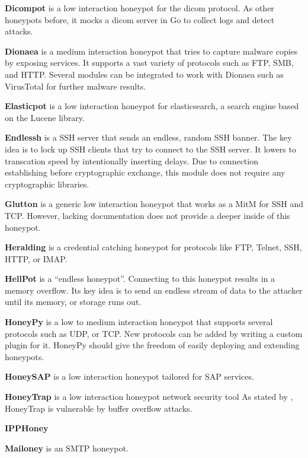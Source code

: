 \textbf{Dicompot} \cite{dicompot2021} is a low interaction honeypot for the \ac{dicom} protocol.
As other honeypots before, it mocks a \ac{dicom} server in Go to collect logs and detect attacks.

\textbf{Dionaea} \cite{dionaea2021} is a medium interaction honeypot that tries to capture malware copies by exposing services.
It supports a vast variety of protocols such as FTP, SMB, and HTTP.
Several modules can be integrated to work with Dionaea such as VirusTotal for further malware results.

\textbf{Elasticpot} \cite{elasticpot2021} is a low interaction honeypot for elasticsearch, a search engine based on the Lucene library.

\textbf{Endlessh} \cite{endlessh2021} is a SSH server that sends an endless, random SSH banner.
The key idea is to lock up SSH clients that try to connect to the SSH server.
It lowers to transcation speed by intentionally inserting delays.
Due to connection establishing before cryptographic exchange, this module does not require any cryptographic libraries.

\textbf{Glutton} \cite{glutton2021} is a generic low interaction honeypot that works as a MitM for SSH and TCP.
However, lacking documentation does not provide a deeper inside of this honeypot. 

\textbf{Heralding} \cite{heralding2021} is a credential catching honeypot for protocols like FTP, Telnet, SSH, HTTP, or IMAP.

\textbf{HellPot} \cite{hellpot2021} is a \enquote{endless honeypot}.
Connecting to this honeypot results in a memory overflow.
Its key idea is to send an endless stream of data to the attacker until its memory, or storage runs out.

\textbf{HoneyPy} \cite{honeysap2021} is a low to medium interaction honeypot that supports several protocols such as UDP, or TCP.
New protocols can be added by writing a custom plugin for it.
HoneyPy should give the freedom of easily deploying and extending honeypots.

\textbf{HoneySAP} \cite{honeysap2021} is a low interaction honeypot tailored for SAP services.

\textbf{HoneyTrap} \cite{honeytrap2021} is a low interaction honeypot network security tool 
As stated by \citet*{honeytrap2021}, HoneyTrap is vulnerable by buffer overflow attacks.

\textbf{IPPHoney} \cite{ipphoney2021}

\textbf{Mailoney} is an SMTP honeypot.

